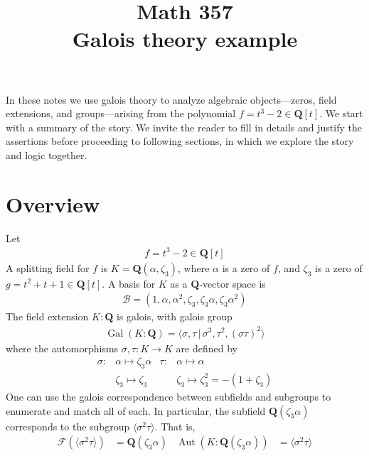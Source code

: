 \documentclass[oneside, english, 11pt]{article}
\title{Math 357\\Galois theory example}
\newcommand{\fontField}[1]{\mathbf{#1}}
\newcommand{\Aut}{\automorphisms}
\DeclareMathOperator{\automorphisms}{Aut}
\newcommand{\fixedField}{\mathcal{F}}
\newcommand{\Gal}{\galoisGroup}
\DeclareMathOperator{\galoisGroup}{Gal}
\newcommand{\Q}{\rationals}
\newcommand{\rationals}{\fontField{Q}}
\newcommand{\st}{{\, | \,}}
\begin{document}
\maketitle

In these notes we use galois theory to analyze algebraic objects---zeros, field extensions, and groups---arising from the polynomial $f = t^{3} - 2 \in \Q[t]$. We start with a summary of the story. We invite the reader to fill in details and justify the assertions before proceeding to following sections, in which we explore the story and logic together.



\section{Overview}

Let
\begin{align*}
f
=
t^{3} - 2
\in
\Q[t]
\end{align*}
A splitting field for $f$ is $K = \Q(\alpha, \zeta_{3})$, where $\alpha$ is a zero of $f$, and $\zeta_{3}$ is a zero of $g = t^{2} + t + 1 \in \Q[t]$. A basis for $K$ as a $\Q$-vector space is
\begin{align*}
\mathcal{B}
=
(1, \alpha, \alpha^{2}, \zeta_{3}, \zeta_{3} \alpha, \zeta_{3} \alpha^{2})
\end{align*}
The field extension $K : \Q$ is galois, with galois group
\begin{align*}
\Gal(K : \Q)
=
\langle{}\sigma, \tau \st \sigma^{3}, \tau^{2}, (\sigma \tau)^{2}\rangle{}
\end{align*}
where the automorphisms $\sigma, \tau : K \rightarrow K$ are defined by
\begin{align}
\sigma
:{}
&\alpha \mapsto \zeta_{3} \alpha
&
\tau
:{}
&\alpha \mapsto \alpha
\label{eq : generators of galois group}
\\
&\zeta_{3} \mapsto \zeta_{3}
&
&\zeta_{3} \mapsto \zeta_{3}^{2} = -(1 + \zeta_{3})
\nonumber
\end{align}
One can use the galois correspondence between subfields and subgroups to enumerate and match all of each. In particular, the subfield $\Q(\zeta_{3} \alpha)$ corresponds to the subgroup $\langle{}\sigma^{2} \tau\rangle{}$. That is,
\begin{align*}
\fixedField(\langle{}\sigma^{2} \tau\rangle{})
&=
\Q(\zeta_{3} \alpha)
&
\Aut(K : \Q(\zeta_{3} \alpha))
&
=
\langle{}\sigma^{2} \tau\rangle{}
\end{align*}
\end{document}
